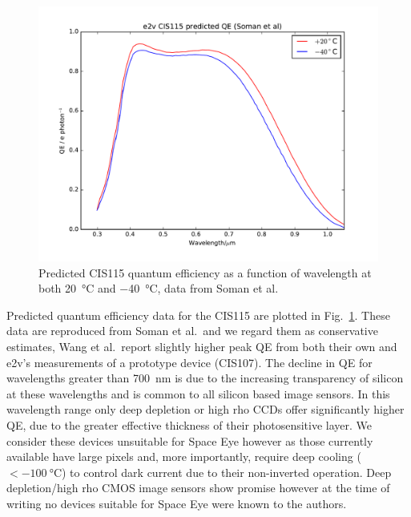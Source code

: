 \documentclass[]{iac}
\begin{document}
\begin{figure}[tp]
  \center
  \includegraphics[width=\columnwidth]{figures/CIS115QE.pdf}
  \caption{\label{fig:qe}Predicted CIS115 quantum efficiency as a function of wavelength at both \SI{+20}{\celsius} and
    \SI{-40}{\celsius}, data from Soman et al.\cite{Soman2014}}
\end{figure}

Predicted quantum efficiency data for the CIS115 are plotted in Fig.~\ref{fig:qe}. These data are reproduced from Soman
et al.\cite{Soman2014}\ and we regard them as conservative estimates, Wang et al.\cite{Wang2014}\ report slightly higher
peak QE from both their own and e2v's measurements of a prototype device (CIS107). The decline in QE for wavelengths
greater than \SI{700}{\nano\metre} is due to the increasing transparency of silicon at these wavelengths and is common
to all silicon based image sensors. In this wavelength range only deep depletion or high rho CCDs offer significantly
higher QE, due to the greater effective thickness of their photosensitive layer. We consider these devices unsuitable
for Space Eye however as those currently available have large pixels and, more importantly, require deep cooling
($<\SI{-100}{\celsius}$) to control dark current due to their non-inverted operation. Deep depletion/high rho CMOS image
sensors show promise however at the time of writing no devices suitable for Space Eye were known to the authors.
\end{document}
